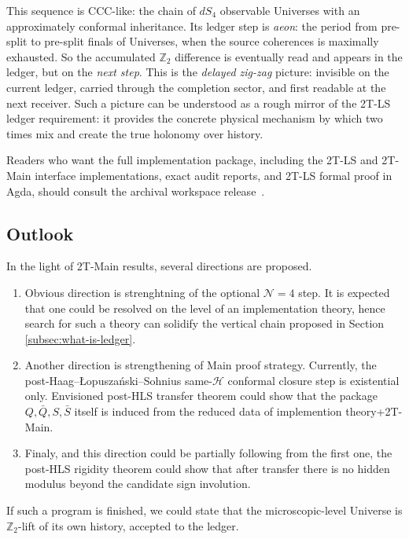 \documentclass[
  aps,
  prd,
  onecolumn,
  notitlepage,
  nofootinbib,
  superscriptaddress,
  10pt
]{revtex4-2}
\theoremstyle{definition}
\theoremstyle{plain}
\begin{document}
This sequence is CCC-like: the chain of \(dS_4\) observable Universes with an approximately conformal inheritance. Its ledger step is \emph{aeon}: the period from pre-split to pre-split finals of Universes, when the source coherences is maximally exhausted. So the accumulated \(\mathbb{Z}_2\) difference is eventually read and appears in the
ledger, but on the \emph{next step}.  This is the \emph{delayed zig-zag} picture: invisible on the current ledger, carried
through the completion sector, and first readable at the next receiver. Such a picture can be understood as a rough mirror of the 2T-LS ledger requirement: it provides the concrete physical mechanism by which two times mix and create the true holonomy over history.

Readers who want the full implementation package, including the 2T-LS and 2T-Main interface implementations,
exact audit reports, and 2T-LS formal proof in Agda, should consult the
archival workspace release~\cite{TwoTimesWorkspace2026}.

\subsection{Outlook}

In the light of 2T-Main results, several directions are proposed.  
\begin{enumerate}
  \item Obvious direction is strenghtning of the optional $\mathcal{N}=4$ step. It is expected that one could be resolved on the level of an implementation theory, hence search for such a theory can solidify the vertical chain proposed in Section \ref{subsec:what-is-ledger}.
  \item Another direction is strengthening of Main proof strategy. Currently, the post-Haag--\L opusza\'nski--Sohnius same-\(\mathcal H\) conformal closure step is existential only. Envisioned post-HLS transfer theorem could show that the package \(Q,\bar Q,S,\bar S\) itself is induced from the reduced data of implemention theory+2T-Main.
  \item Finaly, and this direction could be partially following from the first one, the post-HLS rigidity theorem could show that after transfer there is no hidden modulus beyond the candidate sign involution.
\end{enumerate}

If such a program is finished, we could state that the microscopic-level Universe is \(\mathbb{Z}_2\)-lift of its own history, accepted to the ledger.
\end{document}
